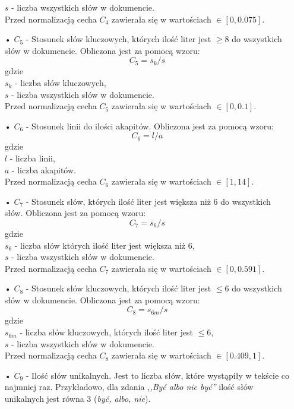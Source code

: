 \documentclass{classrep}
\begin{document}
\begin{itemize}
$s$ - liczba wszystkich słów w dokumencie.\\
Przed normalizacją cecha $C_{4}$ zawierała się w wartościach $\in [0,0.075]$.
\item[•] $C_5$ - Stosunek słów kluczowych, których ilość liter jest $\geq$8 do wszystkich słów w dokumencie. Obliczona jest za pomocą wzoru:
\begin{equation} C_5 = s_k / s  \end{equation} gdzie \\
$s_k$ - liczba słów kluczowych, \\
$s$ - liczba wszystkich słów w dokumencie. \\
Przed normalizacją cecha $C_{5}$ zawierała się w wartościach $\in [0,0.1]$.
\item[•] $C_6$ - Stosunek linii do ilości akapitów. Obliczona jest za pomocą wzoru:
\begin{equation} C_6 = l / a  \end{equation} gdzie \\
$l$ - liczba linii,\\
$a$ - liczba akapitów.\\
Przed normalizacją cecha $C_{6}$ zawierała się w wartościach $\in [1,14]$.
\item[•] $C_7$ - Stosunek słów, których ilość liter jest większa niż 6 do wszystkich słów. Obliczona jest za pomocą wzoru:
\begin{equation} C_7 = s_6 / s  \end{equation} gdzie \\
$s_6$ - liczba słów których ilość liter jest większa niż 6, \\
$s$ - liczba wszystkich słów w dokumencie.\\
Przed normalizacją cecha $C_{7}$ zawierała się w wartościach $\in [0,0.591]$.
\item[•] $C_8$ - Stosunek słów kluczowych, których ilość liter jest $\leq$6 do wszystkich słów w dokumencie. Obliczona jest za pomocą wzoru:
\begin{equation} C_8 = s_{6m} / s  \end{equation} gdzie \\
$s_{6m}$ - liczba słów kluczowych, których ilość liter jest $\leq$6, \\
$s$ - liczba wszystkich słów w dokumencie. \\
Przed normalizacją cecha $C_{8}$ zawierała się w wartościach $\in [0.409,1]$.
\item[•] $C_9$ - Ilość słów unikalnych. Jest to liczba słów, które wystąpiły w tekście co najmniej raz. Przykładowo, dla zdania \textsl{,,Być albo nie być''} ilość słów unikalnych jest równa 3 (\textsl{być, albo, nie}).\\

\end{itemize}
\end{document}
